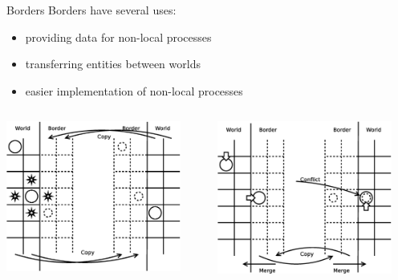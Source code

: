 \documentclass{beamer}
\begin{document}
\begin{frame}{Borders}
    Borders have several uses:
    \begin{itemize}
        \item providing data for non-local processes
        \item transferring entities between worlds
        \item easier implementation of non-local processes
    \end{itemize}
    \begin{columns}
        \begin{column}{.5\textwidth}
            \includegraphics[width=0.9\textwidth]{border1}
        \end{column}
        \begin{column}{.5\textwidth}
            \includegraphics[width=0.9\textwidth]{border2}
        \end{column}
    \end{columns}
\end{frame}
\end{document}
